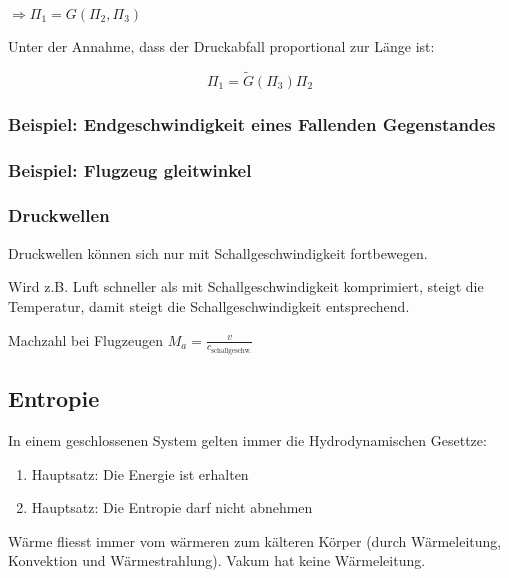 \documentclass[a4paper]{scrartcl}
\begin{document}
$\Rightarrow \Pi_1 = G(\Pi_2, \Pi_3)$

Unter der Annahme, dass der Druckabfall proportional zur Länge ist:

\[
	\Pi_1 = \tilde{G}(\Pi_3)\Pi_2
\]



\subsubsection{Beispiel: Endgeschwindigkeit eines Fallenden Gegenstandes}


\subsubsection{Beispiel: Flugzeug gleitwinkel}



\subsubsection{Druckwellen}

Druckwellen können sich nur mit Schallgeschwindigkeit fortbewegen.

Wird z.B. Luft schneller als mit Schallgeschwindigkeit komprimiert, steigt die Temperatur, damit steigt die Schallgeschwindigkeit entsprechend.

Machzahl bei Flugzeugen $M_a = \frac{v}{c_{\text{schallgeschw.}}}$




\subsection{Entropie}

In einem geschlossenen System gelten immer die Hydrodynamischen Gesettze:

\begin{enumerate}
	\item Hauptsatz: Die Energie ist erhalten
	\item Hauptsatz: Die Entropie darf nicht abnehmen
\end{enumerate}


Wärme fliesst immer vom wärmeren zum kälteren Körper (durch Wärmeleitung, Konvektion und Wärmestrahlung). Vakum hat keine Wärmeleitung.
\end{document}
